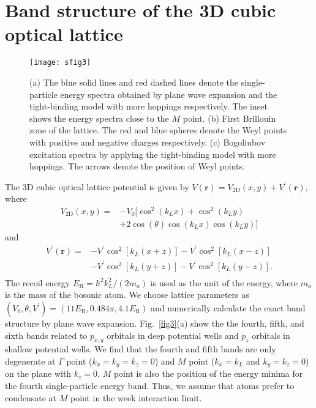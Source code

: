 \documentclass[aps,pra,floatfix,twocolumn,superscriptaddress]{revtex4-1}
\begin{document}
\section{Band structure of the 3D cubic optical lattice}
\label{appendixC}
\begin{figure}[htbp]
	\centering
	\texttt{[image: sfig3]}
	\caption{(a) The blue solid lines and red dashed lines denote the single-particle energy spectra obtained by plane wave expansion and the tight-binding model with more hoppings respectively. The inset shows the energy spectra close to the $M$ point. (b) First Brillouin zone of the lattice. The red and blue spheres denote the Weyl points with positive and negative charges respectively. (c) Bogoliubov excitation spectra by applying the tight-binding model with more hoppings. The arrows denote the position of Weyl points.}
	\label{sfig3}
\end{figure}
The 3D cubic optical lattice potential is given by $V(\mathbf{r})=V_\mathrm{2D}(x,y)+V^{\prime}(\mathbf{r})$, where
\begin{equation}
\begin{aligned}
V_\mathrm{2D}(x,y)=&-V_0\big[\cos^2(k_Lx)+\cos^2(k_Ly)\\
&+2\cos(\theta)\cos(k_Lx)\cos(k_Ly)\big]
\end{aligned}
\end{equation}
and
\begin{equation}
	\begin{aligned}
		V^{\prime}(\mathbf{r})=&-V^\prime\cos^{2}[k_{L}(x+z)]-V^\prime\cos^{2}[k_{L}(x-z)]\\
		&-V^\prime\cos^{2}[k_{L}(y+z)]-V^\prime\cos^{2}[k_{L}(y-z)].\\
	\end{aligned}
\end{equation}
The recoil energy $E_\mathrm{R}=\hbar^2k_L^2/(2m_a)$ is used as the unit of the energy, where $m_a$ is the mass of the bosonic atom. We choose lattice parameters as $(V_0,\theta,V^\prime)=(11 E_\mathrm{R},0.484\pi,4.1 E_\mathrm{R})$ and numerically calculate the exact band structure by plane wave expansion. Fig.~\ref{fig3}(a) show the the fourth, fifth, and sixth bands related to $p_{x,y}$ orbitals in deep potential wells and $p_z$ orbitals in shallow potential wells. We find that the fourth and fifth bands are only degenerate at
$\Gamma$ point ($k_x=k_y=k_z=0$) and $M$ point ($k_x=k_L$ and $k_y=k_z=0$) on the plane with $k_z=0$. $M$ point is also the position of the energy minima for the fourth single-particle energy band. Thus, we assume that atoms prefer to condensate at $M$ point in the week interaction limit.
\end{document}

